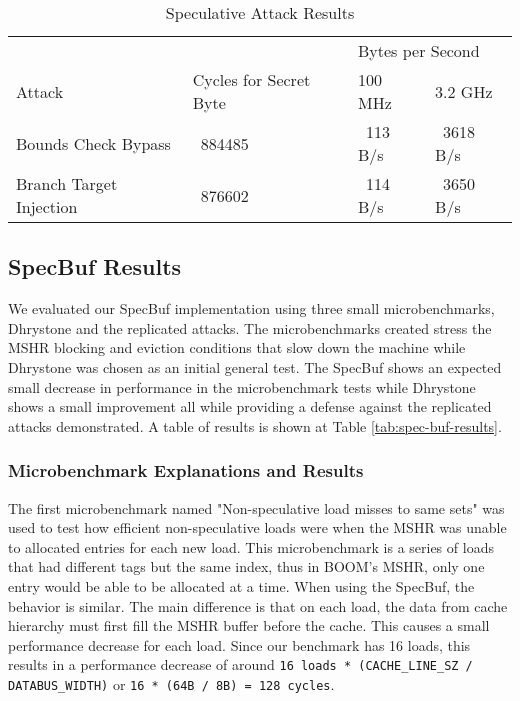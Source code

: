 \begin{table}
\centering
\caption{Speculative Attack Results}
\label{tab:spec-attack-results}
\begin{tabular}{@{} *4l @{}} \toprule
    &                        & \multicolumn{2}{l}{Bytes per Second} \\
    Attack                  & Cycles for Secret Byte &           100 MHz &   3.2 GHz \\ \midrule
    Bounds Check Bypass     &                ~884485 &          ~113 B/s & ~3618 B/s \\
    Branch Target Injection &                ~876602 &          ~114 B/s & ~3650 B/s \\ \bottomrule
\end{tabular}
\end{table}

\subsection{SpecBuf Results}

We evaluated our SpecBuf implementation using three small microbenchmarks, Dhrystone and the 
replicated attacks. The microbenchmarks created stress the MSHR blocking and eviction conditions
that slow down the machine while Dhrystone was chosen as an initial general test. The SpecBuf shows an expected small decrease
in performance in the microbenchmark tests while Dhrystone shows a small improvement all while providing
a defense against the replicated attacks demonstrated. A table of results is shown at Table \ref{tab:spec-buf-results}.

\subsubsection{Microbenchmark Explanations and Results}

The first microbenchmark named "Non-speculative load misses to same sets" was used to test how efficient non-speculative loads
were when the MSHR was unable to allocated entries for each new load. This microbenchmark is a series of loads that had different
tags but the same index, thus in BOOM's MSHR, only one entry would be able to be allocated at a time. When using the SpecBuf, the 
behavior is similar. The main difference is that on each load, the data from cache hierarchy must first fill the MSHR buffer
before the cache. This causes a small performance decrease for each load. Since our benchmark has 16 loads, this results in a performance decrease of around
{\tt 16 loads * (CACHE\_LINE\_SZ / DATABUS\_WIDTH)} or {\tt 16 * (64B / 8B) = 128 cycles}.

